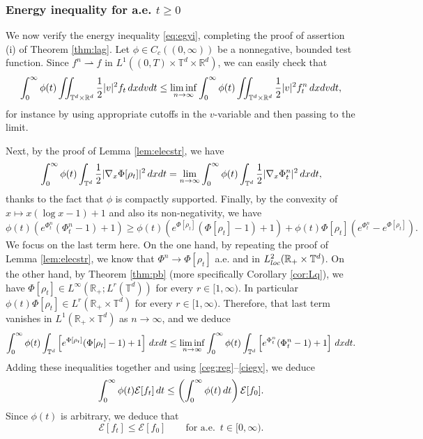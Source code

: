 \documentclass[11pt,reqno,a4paper]{amsart}
\newcommand{\R}{\mathbb{R}}
\newcommand{\intt}{\int_{\T^d}}
\theoremstyle{definition}
\theoremstyle{remark}
\numberwithin{equation}{section}
\newcommand{\T} {\mathbb T}
\newcommand{\lt}{\left}
\newcommand{\rt}{\right}
\newcommand{\bq}{\begin{equation}}
\newcommand{\eq}{\end{equation}}
\newcommand{\calE}{\mathcal E}
\newcommand{\weakto}{\rightharpoonup}
\newcommand{\dx}{\textnormal{d}x}
\newcommand{\dv}{\textnormal{d}v}
\newcommand{\dt}{\textnormal{d}t}
\begin{document}
%
%
%
%
%

 


\subsubsection{Energy inequality for a.e. $t\ge 0$}
We now verify the energy inequality \eqref{eq:egyi}, completing the proof of assertion (i) of Theorem \ref{thm:lag}. Let $\phi \in C_c((0,\infty))$ be a nonnegative, bounded test function. Since $f^n \weakto f$ in $L^1((0,T)\times\T^d\times\R^d)$, we can easily check that
\[%
\int_0^\infty \phi(t)\iint_{\T^d\times\R^d} \frac{1}{2}|v|^2f_t\,\dx\dv\dt \le \liminf_{n \to \infty} \int_0^\infty \phi(t)\iint_{\T^d\times\R^d} \frac{1}{2}|v|^2f_t^n\,\dx\dv\dt,
\]%
for instance by using appropriate cutoffs in the $v$-variable and then passing to the limit.


Next, by the proof of Lemma \ref{lem:elecstr}, we have
\[
\int_0^\infty \phi(t) \intt
\frac{1}{2}|\nabla_x\Phi[\rho_t]|^2\,\dx\dt
=
\lim_{n\to \infty}
\int_0^\infty \phi(t)\intt
\frac{1}{2}|\nabla_x\Phi_t^n|^2\,\dx\dt,
\]
thanks to the fact that $\phi$ is compactly supported. Finally, by the convexity of $x \mapsto x(\log x -1) +1$ and also its non-negativity, we have
\[
\phi(t)\lt(e^{\Phi_t^n}(\Phi_t^n - 1) + 1\rt) \ge  \phi(t)\lt(e^{\Phi[\rho_t]}(\Phi[\rho_t]-1) + 1\rt) +\phi(t) \Phi[\rho_t]\lt(e^{\Phi_t^n}-e^{\Phi[\rho_t]}\rt). 
\]
We focus on the last term here. On the one hand, by repeating the proof of Lemma \ref{lem:elecstr}, we know that $\Phi^n\to \Phi[\rho_t]$ a.e. and in $L^2_{\rm loc}(\R_+\times \T^d)$. On the other hand, by Theorem \ref{thm:pb} (more specifically Corollary \ref{cor:Lq}), we have $\Phi[\rho_t]\in L^\infty(\R_+;L^r(\T^d))$ for every $r\in [1,\infty)$. In particular $\phi(t) \Phi[\rho_t] \in L^r(\R_+\times \T^d)$ for every $r\in [1,\infty)$. Therefore, that last term vanishes in $L^1(\R_+\times \T^d)$ as $n\to\infty$, and we deduce
\[%
\int_0^\infty \phi(t)\intt \lt[e^{\Phi[\rho_t]}(\Phi[\rho_t]-1) + 1\rt]\,\dx\dt  \le \liminf_{n\to \infty} \int_0^\infty \phi(t)\intt \lt[e^{\Phi_t^n}(\Phi_t^n-1) + 1\rt]\,\dx\dt. 
\]%
Adding these inequalities together and using \eqref{ceg:reg}--\eqref{ciegy}, we deduce
\[
\int_0^\infty \phi(t) \calE[f_t]\,\dt \le \lt(\int_0^\infty \phi(t) \,\dt\rt) \calE[f_0].
\]
Since $\phi(t)$ is arbitrary, we deduce that
\begin{equation}
\label{eq: egyi ae}
\calE[f_t] \le \calE[f_0]\qquad \mbox{for a.e.}\,\,\, t \in [0,\infty).
\end{equation}
%
%
%
%
%
\end{document}
